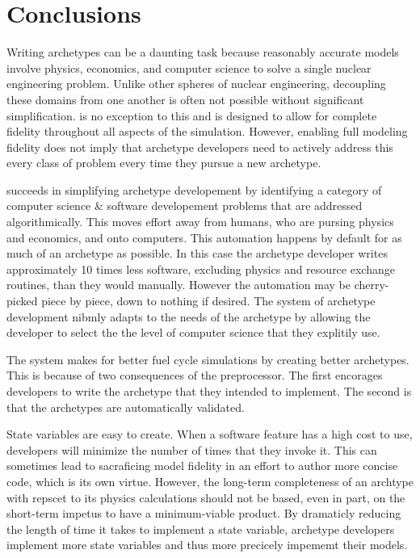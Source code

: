 \section{Conclusions}

Writing archetypes can be a daunting task because reasonably accurate models 
involve physics, economics, and computer science to solve a single nuclear engineering 
problem.  Unlike other spheres of nuclear engineering, decoupling these domains from
one another is often not possible without significant simplification. \cyclus is 
no exception to this and is designed to allow for complete fidelity throughout 
all aspects of the simulation. However, enabling full modeling fidelity does
not imply that archetype developers need to actively address this every class of 
problem every time they pursue a new archetype.

\Cyclus succeeds in simplifying archetype developement by identifying a category 
of computer science \& software developement problems that are addressed 
algorithmically. This moves effort away from humans, who are pursing physics and
economics, and onto computers. This automation happens by default for as much of
an archetype as possible. In this case the archetype developer writes approximately
10 times less software, excluding physics and resource exchange routines, than
they would manually. However the automation may be cherry-picked piece by piece,
down to nothing if desired. The \cyclus system of archetype development nibmly 
adapts to the needs of the archetype by allowing the developer to select the 
the level of computer science that they explitily use.  

The \cyclus system makes for better fuel cycle simulations by creating better 
archetypes.  This is because of two consequences of the preprocessor. The first 
\cyclus encorages developers to write the archetype
that they intended to implement. The second is that the archetypes are automatically
validated.

State variables are easy to create. When a software feature has a high cost to use,
developers will minimize the number of times that they invoke it. This can 
sometimes lead to sacraficing model fidelity in an effort to author more concise
code, which is its own virtue. However, the long-term completeness of an archtype
with repscet to its physics calculations should not be based, even in part, on the
short-term impetus to have a minimum-viable product. By dramaticly reducing the 
length of time it takes to implement a state variable, archetype developers implement
more state variables and thus more precicely impememt their models.

